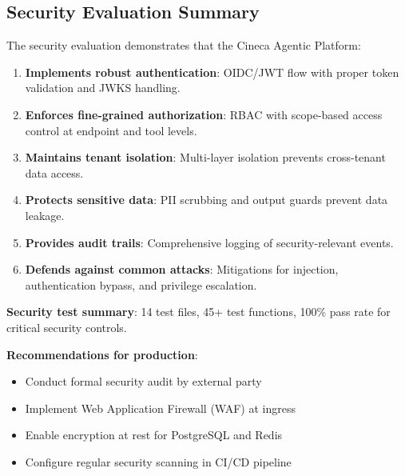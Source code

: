 \subsection{Security Evaluation Summary}

The security evaluation demonstrates that the Cineca Agentic Platform:

\begin{enumerate}
    \item \textbf{Implements robust authentication}: OIDC/JWT flow with proper token validation and JWKS handling.
    
    \item \textbf{Enforces fine-grained authorization}: RBAC with scope-based access control at endpoint and tool levels.
    
    \item \textbf{Maintains tenant isolation}: Multi-layer isolation prevents cross-tenant data access.
    
    \item \textbf{Protects sensitive data}: PII scrubbing and output guards prevent data leakage.
    
    \item \textbf{Provides audit trails}: Comprehensive logging of security-relevant events.
    
    \item \textbf{Defends against common attacks}: Mitigations for injection, authentication bypass, and privilege escalation.
\end{enumerate}

\textbf{Security test summary}: 14 test files, 45+ test functions, 100\% pass rate for critical security controls.

\textbf{Recommendations for production}:
\begin{itemize}
    \item Conduct formal security audit by external party
    \item Implement Web Application Firewall (WAF) at ingress
    \item Enable encryption at rest for PostgreSQL and Redis
    \item Configure regular security scanning in CI/CD pipeline
\end{itemize}

